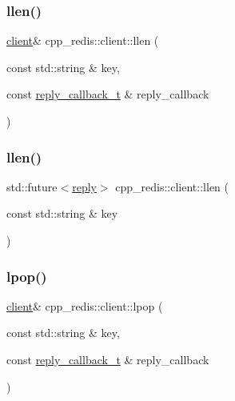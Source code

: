 \subsubsection{\texorpdfstring{llen()}{llen()}\hspace{0.1cm}{\footnotesize\ttfamily [1/2]}}
{\footnotesize\ttfamily \hyperlink{classcpp__redis_1_1client}{client}\& cpp\+\_\+redis\+::client\+::llen (\begin{DoxyParamCaption}\item[{const std\+::string \&}]{key,  }\item[{const \hyperlink{classcpp__redis_1_1client_a061a1140d36d2eaeda82b09a0bb3f9f2}{reply\+\_\+callback\+\_\+t} \&}]{reply\+\_\+callback }\end{DoxyParamCaption})}

\mbox{\label{classcpp__redis_1_1client_a2890fccb9efd08b38195c8fb5fd1651e}} 
\subsubsection{\texorpdfstring{llen()}{llen()}\hspace{0.1cm}{\footnotesize\ttfamily [2/2]}}
{\footnotesize\ttfamily std\+::future$<$\hyperlink{classcpp__redis_1_1reply}{reply}$>$ cpp\+\_\+redis\+::client\+::llen (\begin{DoxyParamCaption}\item[{const std\+::string \&}]{key }\end{DoxyParamCaption})}

\mbox{\label{classcpp__redis_1_1client_ad4060807b9b9aa330ad11dedd69e80b8}} 
\subsubsection{\texorpdfstring{lpop()}{lpop()}\hspace{0.1cm}{\footnotesize\ttfamily [1/2]}}
{\footnotesize\ttfamily \hyperlink{classcpp__redis_1_1client}{client}\& cpp\+\_\+redis\+::client\+::lpop (\begin{DoxyParamCaption}\item[{const std\+::string \&}]{key,  }\item[{const \hyperlink{classcpp__redis_1_1client_a061a1140d36d2eaeda82b09a0bb3f9f2}{reply\+\_\+callback\+\_\+t} \&}]{reply\+\_\+callback }\end{DoxyParamCaption})}

